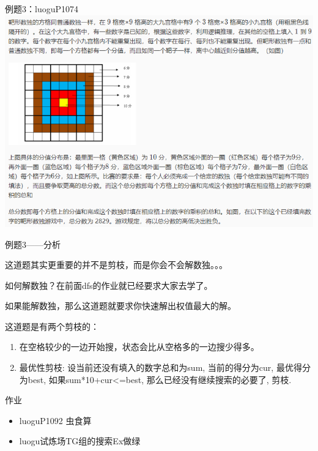 \documentclass{bemaer}[UTF-8]
\begin{document}
\begin{frame}{例题3：luoguP1074}
\includegraphics{luoguP1074.png}
\end{frame}

\begin{frame}{例题3——分析}
\item 这道题其实更重要的并不是剪枝，而是你会不会解数独。。。
\item 如何解数独？在前面dfs的作业就已经要求大家去学了。
\item 如果能解数独，那么这道题就要求你快速解出权值最大的解。
\item 这道题是有两个剪枝的：
\begin{enumerate}
\item 在空格较少的一边开始搜，状态会比从空格多的一边搜少得多。
\item 最优性剪枝: 设当前还没有填入的数字总和为sum, 当前的得分为cur, 最优得分为best, 如果sum*10+cur<=best, 那么已经没有继续搜索的必要了, 剪枝.
\end{enumerate}

\end{frame}

\begin{frame}{作业}
\begin{itemize}
  \item luoguP1092 虫食算
  \item luogu试炼场TG组的搜索Ex做绿
\end{itemize}
\end{frame}
\end{document}
